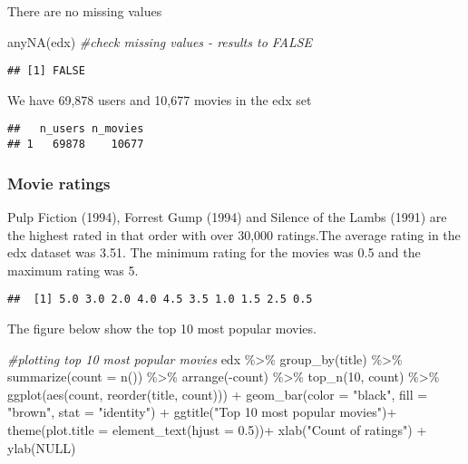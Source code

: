 \documentclass[
]{article}
\newenvironment{Shaded}{\begin{snugshade}}{\end{snugshade}}
\newcommand{\AttributeTok}[1]{\textcolor[rgb]{0.77,0.63,0.00}{#1}}
\newcommand{\CommentTok}[1]{\textcolor[rgb]{0.56,0.35,0.01}{\textit{#1}}}
\newcommand{\ConstantTok}[1]{\textcolor[rgb]{0.00,0.00,0.00}{#1}}
\newcommand{\DecValTok}[1]{\textcolor[rgb]{0.00,0.00,0.81}{#1}}
\newcommand{\FloatTok}[1]{\textcolor[rgb]{0.00,0.00,0.81}{#1}}
\newcommand{\FunctionTok}[1]{\textcolor[rgb]{0.00,0.00,0.00}{#1}}
\newcommand{\NormalTok}[1]{#1}
\newcommand{\SpecialCharTok}[1]{\textcolor[rgb]{0.00,0.00,0.00}{#1}}
\newcommand{\StringTok}[1]{\textcolor[rgb]{0.31,0.60,0.02}{#1}}
\begin{document}
There are no missing values

\begin{Shaded}
\begin{Highlighting}[]
\FunctionTok{anyNA}\NormalTok{(edx) }\CommentTok{\#check missing values {-} results to FALSE}
\end{Highlighting}
\end{Shaded}

\begin{verbatim}
## [1] FALSE
\end{verbatim}

We have 69,878 users and 10,677 movies in the edx set

\begin{verbatim}
##   n_users n_movies
## 1   69878    10677
\end{verbatim}

\hypertarget{movie-ratings}{%
\subsubsection{Movie ratings}\label{movie-ratings}}

Pulp Fiction (1994), Forrest Gump (1994) and Silence of the Lambs (1991)
are the highest rated in that order with over 30,000 ratings.The average
rating in the edx dataset was 3.51. The minimum rating for the movies
was 0.5 and the maximum rating was 5.

\begin{verbatim}
##  [1] 5.0 3.0 2.0 4.0 4.5 3.5 1.0 1.5 2.5 0.5
\end{verbatim}

The figure below show the top 10 most popular movies.

\begin{Shaded}
\begin{Highlighting}[]
\CommentTok{\#plotting top 10 most popular movies}
\NormalTok{edx }\SpecialCharTok{\%\textgreater{}\%}
  \FunctionTok{group\_by}\NormalTok{(title) }\SpecialCharTok{\%\textgreater{}\%}
  \FunctionTok{summarize}\NormalTok{(}\AttributeTok{count =} \FunctionTok{n}\NormalTok{()) }\SpecialCharTok{\%\textgreater{}\%}
  \FunctionTok{arrange}\NormalTok{(}\SpecialCharTok{{-}}\NormalTok{count) }\SpecialCharTok{\%\textgreater{}\%}
  \FunctionTok{top\_n}\NormalTok{(}\DecValTok{10}\NormalTok{, count) }\SpecialCharTok{\%\textgreater{}\%}
  \FunctionTok{ggplot}\NormalTok{(}\FunctionTok{aes}\NormalTok{(count, }\FunctionTok{reorder}\NormalTok{(title, count))) }\SpecialCharTok{+}
  \FunctionTok{geom\_bar}\NormalTok{(}\AttributeTok{color =} \StringTok{"black"}\NormalTok{, }\AttributeTok{fill =} \StringTok{"brown"}\NormalTok{, }\AttributeTok{stat =} \StringTok{"identity"}\NormalTok{) }\SpecialCharTok{+}
  \FunctionTok{ggtitle}\NormalTok{(}\StringTok{"Top 10 most popular movies"}\NormalTok{)}\SpecialCharTok{+}
  \FunctionTok{theme}\NormalTok{(}\AttributeTok{plot.title =} \FunctionTok{element\_text}\NormalTok{(}\AttributeTok{hjust =} \FloatTok{0.5}\NormalTok{))}\SpecialCharTok{+}
  \FunctionTok{xlab}\NormalTok{(}\StringTok{"Count of ratings"}\NormalTok{) }\SpecialCharTok{+}
  \FunctionTok{ylab}\NormalTok{(}\ConstantTok{NULL}\NormalTok{) }
\end{Highlighting}
\end{Shaded}
\end{document}
